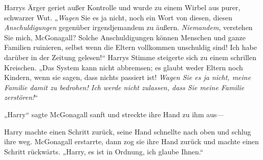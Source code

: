 Harrys Ärger geriet außer Kontrolle und wurde zu einem Wirbel aus purer, schwarzer Wut. „\emph{Wagen} Sie es ja nicht, noch ein Wort von diesen, diesen \emph{Anschuldigungen} gegenüber irgendjemandem zu äußern. \emph{Niemandem}, verstehen Sie mich, McGonagall? Solche Anschuldigungen können Menschen und ganze Familien ruinieren, selbst wenn die Eltern vollkommen unschuldig sind! Ich habe darüber in der Zeitung gelesen!“ Harrys Stimme steigerte sich zu einem schrillen Kreischen. „Das System kann nicht abbremsen; es glaubt weder Eltern noch Kindern, wenn sie sagen, dass nichts passiert ist! \emph{Wagen Sie es ja nicht, meine Familie damit zu bedrohen! Ich werde nicht zulassen, dass Sie meine Familie zerstören!}“

„Harry“ sagte McGonagall sanft und streckte ihre Hand zu ihm aus—

Harry machte einen Schritt zurück, seine Hand schnellte nach oben und schlug ihre weg. McGonagall erstarrte, dann zog sie ihre Hand zurück und machte einen Schritt rückwärts. „Harry, es ist in Ordnung, ich glaube Ihnen.“

